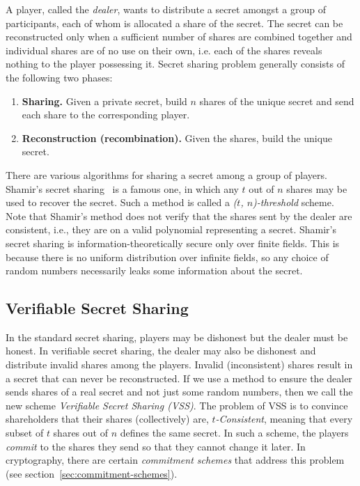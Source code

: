 \documentclass[10pt]{article}
\theoremstyle{plain}
\begin{document}
A player, called the \emph{dealer}, wants to distribute a secret amongst
a group of participants, each of whom is allocated a share of the
secret. The secret can be reconstructed only when a sufficient number
of shares are combined together and individual shares are of no use
on their own, i.e. each of the shares reveals nothing to the player
possessing it. Secret sharing problem generally consists of the following
two phases: 
\begin{enumerate}
	\item \textbf{Sharing.} Given a private secret, build $n$ shares of the
	unique secret and send each share to the corresponding player. 
	\item \textbf{Reconstruction (recombination).} Given the shares, build the
	unique secret. 
\end{enumerate}
There are various algorithms for sharing a secret among a group of
players. Shamir's secret sharing~\cite{shamir:how} is a famous one,
in which any $t$ out of $n$ shares may be used to recover the secret.
Such a method is called a \emph{($t$, $n$)-threshold} scheme. Note
that Shamir's method does not verify that the shares sent by the dealer
are consistent, i.e., they are on a valid polynomial representing
a secret. Shamir's secret sharing is information-theoretically secure
only over finite fields. This is because there is no uniform distribution
over infinite fields, so any choice of random numbers necessarily
leaks some information about the secret.

\subsection{Verifiable Secret Sharing}

\label{sec:vss} In the standard secret sharing, players may be dishonest
but the dealer must be honest. In verifiable secret sharing, the dealer
may also be dishonest and distribute invalid shares among the players.
Invalid (inconsistent) shares result in a secret that can never be
reconstructed. If we use a method to ensure the dealer sends shares
of a real secret and not just some random numbers, then we call the
new scheme \emph{Verifiable Secret Sharing (VSS)}. The problem of
VSS is to convince shareholders that their shares (collectively) are,
\emph{$t$-Consistent}, meaning that every subset of $t$ shares out
of $n$ defines the same secret. In such a scheme, the players \emph{commit}
to the shares they send so that they cannot change it later. In cryptography,
there are certain \emph{commitment schemes} that address this problem
(see section~\ref{sec:commitment-schemes}).
\end{document}
